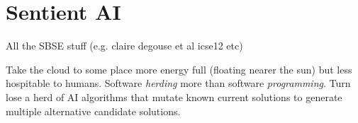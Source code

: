\documentclass[journal]{IEEEtran}
\begin{document}
\section{Sentient AI}

All the SBSE stuff (e.g. claire degouse et al icse12 etc)

Take the cloud to some place more energy full (floating nearer the sun) but less hospitable to humans. Software {\em herding} more
than software {\em programming}. Turn lose a herd of AI algorithms
that mutate known current solutions to generate multiple
alternative candidate solutions.


%
%



%
%
\end{document}
